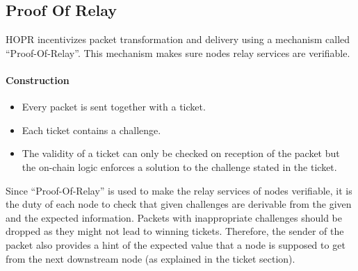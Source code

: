 \subsection{Proof Of Relay}

HOPR incentivizes packet transformation and delivery using a mechanism called “Proof-Of-Relay”.
This mechanism makes sure nodes relay services are verifiable.
\paragraph{Construction}
\begin{itemize}
    \item Every packet is sent together with a ticket.
    \item Each ticket contains a challenge.
    \item The validity of a ticket can only be checked on reception of the packet but the on-chain logic enforces a solution to the challenge stated in the ticket.
\end{itemize}

Since “Proof-Of-Relay” is used to make the relay services of nodes verifiable, it is the duty of each node to check that given challenges are derivable from the given and the expected information.
Packets with inappropriate challenges should be dropped as they might not lead to winning tickets.
Therefore, the sender of the packet also provides a hint of the expected value that a node is supposed to get from the next downstream node (as explained in the ticket section).
\begin{comment}
 \begin{figure}[H]
    \centering
    \begin{tabular}{| m{2em} | m{15em} | m{2em} |}
        \hline
        $\alpha$ & $\beta$                   & $\gamma$ \\
                 & \begin{tabular}{| c m{2em} | m{3em} | m{6em} |}
            \hline
            \multicolumn{2}{| c |}{$Y_B$} & $hint_B$                 & $challenge_{BC}$ \\
            \hline
            \multicolumn{2}{| c |}{$Y_C$} & $hint_C$                 & $random$         \\
            \hline
            \multicolumn{2}{| c |}{$Y_D$} & $hint_D$                 & $random$         \\
            \hline
            End                           & \multicolumn{3}{| l |}{}                    \\
            \hline
        \end{tabular} &          \\[3em]
        \hline
    \end{tabular}
    \caption{SPHINX with PoR}
    \label{fig:SPHINX with PoR}
\end{figure}
\end{comment}